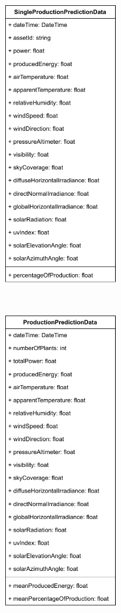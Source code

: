 \begin{figure}[H]
\begin{minipage}[b]{8.5cm}
\centering
\includegraphics[width=0.45\textwidth]{images/single_plant_uml}
\subcaption{}
\label{fig:umlsingleplant}
\end{minipage}
\ \hspace{2mm} \
\begin{minipage}[b]{8.5cm}
\centering
\includegraphics[width=0.45\textwidth]{images/production_prediction_uml}

\end{minipage}
\end{figure}
